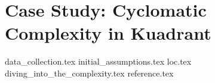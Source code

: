 \section{Case Study: Cyclomatic Complexity in Kuadrant}
{data_collection.tex}
{initial_assumptions.tex}
{loc.tex}
{diving_into_the_complexity.tex}
{reference.tex}
